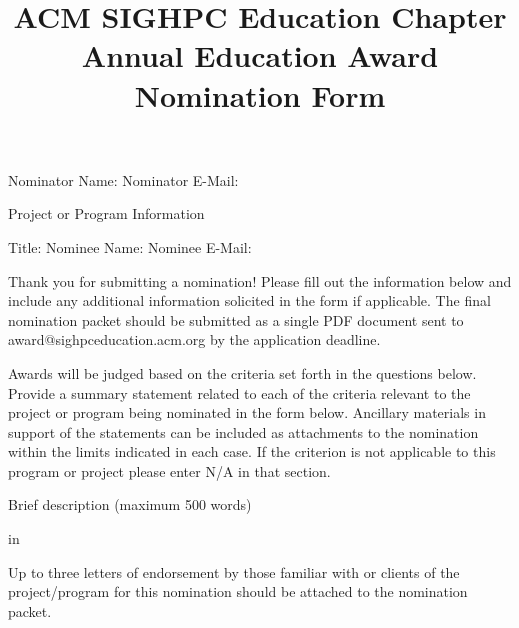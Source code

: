 \documentclass[11pt]{amsart}
\title{ACM SIGHPC Education Chapter Annual Education Award Nomination Form}
\begin{document}
\maketitle

\noindent
Nominator Name:  
\newline Nominator E-Mail:
\newline
\begin{bf} Project or Program Information \end{bf}
\newline
Title: \newline
Nominee Name: \newline
Nominee E-Mail: \newline

Thank you for submitting a nomination!  Please fill out the information below and include any additional information solicited in the form if applicable.  The final nomination packet should be submitted as a single PDF document sent to award@sighpceducation.acm.org by the application deadline. 
\newline

Awards will be judged based on the criteria set forth in the questions below.  Provide a summary statement related to each of the criteria relevant to the project or program being nominated in the form below.  Ancillary materials in support of the statements can be included as attachments to the nomination within the limits indicated in each case.  If the criterion is not applicable to this program or project please enter N/A in that section.
\newline

\noindent \begin{bf}Brief description (maximum 500 words) \end{bf}
 in










Up to three letters of endorsement by those familiar with or clients of the project/program for this nomination should be attached to the nomination packet.
\newline
\end{document}
